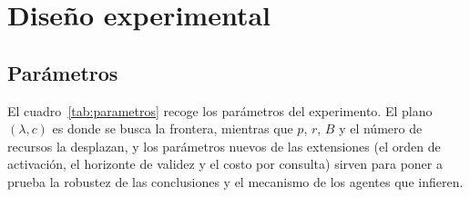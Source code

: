 \section{Diseño experimental}\label{sec:diseno}

\subsection{Parámetros}

El cuadro~\ref{tab:parametros} recoge los parámetros del experimento. El plano $(\lambda, c)$ es donde se busca la frontera, mientras que $p$, $r$, $B$ y el número de recursos la desplazan, y los parámetros nuevos de las extensiones (el orden de activación, el horizonte de validez y el costo por consulta) sirven para poner a prueba la robustez de las conclusiones y el mecanismo de los agentes que infieren.

